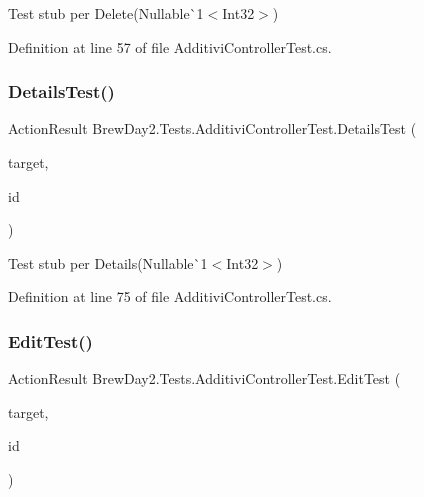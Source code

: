 Test stub per Delete(Nullable\`{}1$<$Int32$>$)



Definition at line 57 of file Additivi\+Controller\+Test.\+cs.

\mbox{\label{class_brew_day2_1_1_tests_1_1_additivi_controller_test_a4d2c41cfc7643d99f9bae1feeda05d0a}} 
\subsubsection{\texorpdfstring{Details\+Test()}{DetailsTest()}}
{\footnotesize\ttfamily Action\+Result Brew\+Day2.\+Tests.\+Additivi\+Controller\+Test.\+Details\+Test (\begin{DoxyParamCaption}\item[{\mbox{[}\+Pex\+Assume\+Under\+Test\mbox{]} \mbox{\hyperlink{class_brew_day2_1_1_controllers_1_1_additivi_controller}{Additivi\+Controller}}}]{target,  }\item[{int?}]{id }\end{DoxyParamCaption})}



Test stub per Details(Nullable\`{}1$<$Int32$>$)



Definition at line 75 of file Additivi\+Controller\+Test.\+cs.

\mbox{\label{class_brew_day2_1_1_tests_1_1_additivi_controller_test_acbb2296c4d6dbd1ba170c5715c6cabf4}} 
\subsubsection{\texorpdfstring{Edit\+Test()}{EditTest()}}
{\footnotesize\ttfamily Action\+Result Brew\+Day2.\+Tests.\+Additivi\+Controller\+Test.\+Edit\+Test (\begin{DoxyParamCaption}\item[{\mbox{[}\+Pex\+Assume\+Under\+Test\mbox{]} \mbox{\hyperlink{class_brew_day2_1_1_controllers_1_1_additivi_controller}{Additivi\+Controller}}}]{target,  }\item[{int?}]{id }\end{DoxyParamCaption})}



